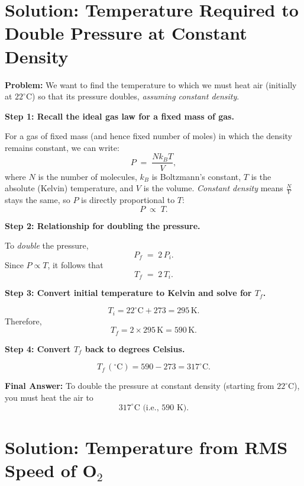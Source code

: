 \documentclass[12pt]{article}
\theoremstyle{definition} %
\theoremstyle{plain} %
\begin{document}
\section*{Solution: Temperature Required to Double Pressure at Constant Density}

\noindent
\textbf{Problem:}
We want to find the temperature to which we must heat air (initially at $22^\circ\mathrm{C}$) so that its pressure doubles, \emph{assuming constant density}.

\vspace{1em}
\noindent
\textbf{Step 1: Recall the ideal gas law for a fixed mass of gas.}

For a gas of fixed mass (and hence fixed number of moles) in which the density remains constant, we can write:
\[
P \;=\; \frac{N k_B T}{V},
\]
where $N$ is the number of molecules, $k_B$ is Boltzmann's constant, $T$ is the absolute (Kelvin) temperature, and $V$ is the volume. 
\emph{Constant density} means $\frac{N}{V}$ stays the same, so $P$ is directly proportional to $T$:
\[
P \;\propto\; T.
\]

\vspace{1em}
\noindent
\textbf{Step 2: Relationship for doubling the pressure.}

To \emph{double} the pressure,
\[
P_f \;=\; 2\,P_i.
\]
Since $P \propto T$, it follows that
\[
T_f \;=\; 2\,T_i.
\]

\vspace{1em}
\noindent
\textbf{Step 3: Convert initial temperature to Kelvin and solve for $T_f$.}

\[
T_i 
= 22^\circ\mathrm{C} + 273 
= 295\,\mathrm{K}.
\]
Therefore,
\[
T_f = 2 \times 295\,\mathrm{K} = 590\,\mathrm{K}.
\]

\vspace{1em}
\noindent
\textbf{Step 4: Convert $T_f$ back to degrees Celsius.}

\[
T_f\,(^\circ\mathrm{C})
= 590 - 273
= 317^\circ\mathrm{C}.
\]

\vspace{1em}
\noindent
\textbf{Final Answer:}
To double the pressure at constant density (starting from $22^\circ\mathrm{C}$), you must heat the air to
\[
\boxed{317^\circ\mathrm{C} \text{ (i.e., } 590\text{ K}).}
\]

\section*{Solution: Temperature from RMS Speed of O$_2$}
\end{document}
